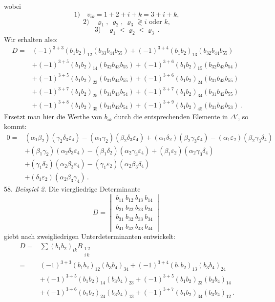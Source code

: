 wobei
\[
1)\quad v_{ik} = 1+2+i+k = 3+i+k,
\]
\[
2)\quad \varrho_1,\ \varrho_2,\ \varrho_3 \gtrless i \text{ oder } k,
\]
\[
3)\quad \varrho_1 < \varrho_2 < \varrho_3 \, .
\]
Wir erhalten also:
\[
\begin{aligned}
D = {}& (-1)^{3+3}(b_1b_2)_{12}(b_{33}b_{44}b_{55}) + (-1)^{3+4}(b_1b_2)_{13}(b_{32}b_{44}b_{55}) \\
& + (-1)^{3+5}(b_1b_2)_{14}(b_{32}b_{43}b_{55}) + (-1)^{3+6}(b_1b_2)_{15}(b_{32}b_{43}b_{54}) \\
& + (-1)^{3+5}(b_1b_2)_{23}(b_{31}b_{44}b_{55}) + (-1)^{3+6}(b_1b_2)_{24}(b_{31}b_{43}b_{55}) \\
& + (-1)^{3+7}(b_1b_2)_{25}(b_{31}b_{43}b_{54}) + (-1)^{3+7}(b_1b_2)_{34}(b_{31}b_{42}b_{55}) \\
& + (-1)^{3+8}(b_1b_2)_{35}(b_{31}b_{42}b_{54}) + (-1)^{3+9}(b_1b_2)_{45}(b_{31}b_{42}b_{53}) \, .
\end{aligned}
\]
Ersetzt man hier die Werthe von $b_{ik}$ durch die entsprechenden Elemente
in $\Delta'$, so kommt:
\[
\begin{aligned}
0 = {}& (\alpha_1\beta_2)(\gamma_2\delta_3\varepsilon_4) - (\alpha_1\gamma_2)(\beta_2\delta_3\varepsilon_4) + (\alpha_1\delta_2)(\beta_2\gamma_3\varepsilon_4) - (\alpha_1\varepsilon_2)(\beta_2\gamma_3\delta_4) \\
& + (\beta_1\gamma_2)(\alpha_2\delta_3\varepsilon_4) - (\beta_1\delta_2)(\alpha_2\gamma_3\varepsilon_4) + (\beta_1\varepsilon_2)(\alpha_2\gamma_3\delta_4) \\
& + (\gamma_1\delta_2)(\alpha_2\beta_3\varepsilon_4) - (\gamma_1\varepsilon_2)(\alpha_2\beta_3\delta_4) \\
& + (\delta_1\varepsilon_2)(\alpha_2\beta_3\gamma_4) \, .
\end{aligned}
\]
58. \textit{Beispiel 2.} Die viergliedrige Determinante
\[
D = \begin{vmatrix}
b_{11}\ b_{12}\ b_{13}\ b_{14} \\
b_{21}\ b_{22}\ b_{23}\ b_{24} \\
b_{31}\ b_{32}\ b_{33}\ b_{34} \\
b_{41}\ b_{42}\ b_{43}\ b_{44}
\end{vmatrix}
\]
giebt nach zweigliedrigen Unterdeterminanten entwickelt:
\[
\begin{aligned}
D = {}& \sum (b_1b_2)_{ik}B_{\substack{1\,2\\ i\,k}} \\
= {}& (-1)^{3+3}(b_1b_2)_{12}(b_3b_4)_{34} + (-1)^{3+4}(b_1b_2)_{13}(b_3b_4)_{24} \\
& + (-1)^{3+5}(b_1b_2)_{14}(b_3b_4)_{23} + (-1)^{3+5}(b_1b_2)_{23}(b_3b_4)_{14} \\
& + (-1)^{3+6}(b_1b_2)_{24}(b_3b_4)_{13} + (-1)^{3+7}(b_1b_2)_{34}(b_3b_4)_{12} \, .
\end{aligned}
\]
